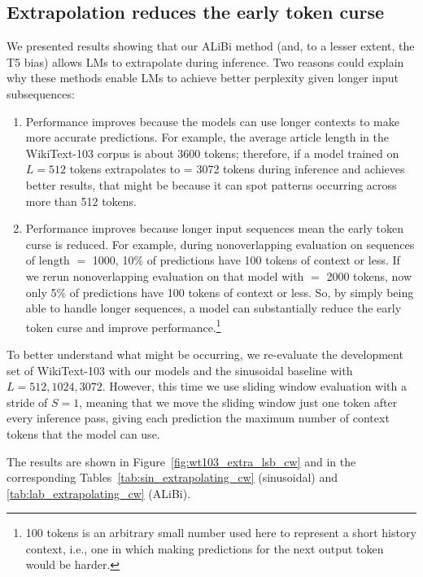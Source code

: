 \subsection{Extrapolation reduces the early token curse}





We presented results showing that our ALiBi method (and, to a lesser extent, the T5 bias) allows LMs to extrapolate during inference. Two reasons could explain why these methods enable LMs to achieve better perplexity given longer input subsequences:
\begin{enumerate}
  \item Performance improves because the models can use longer contexts to make more accurate predictions. For example, the average article length in the WikiText-103 corpus is about 3600 tokens; therefore, if a model trained on $L=512$ tokens extrapolates to \li = 3072 tokens during inference and achieves better results, that might be because it can spot patterns occurring across more than 512 tokens.
  \item Performance improves because longer input sequences mean the early token curse is reduced. %
  For example, during nonoverlapping evaluation on sequences of length \li $=$ 1000, 10\% of predictions have 100 tokens of context or less. If we rerun nonoverlapping evaluation on that model with \li $=$ 2000 tokens, now only 5\% of predictions have 100 tokens of context or less. So, by simply being able to handle longer sequences, a model can substantially reduce the early token curse and improve performance.\footnote{100 tokens is an arbitrary small number used here to represent a short history context, i.e., one in which making predictions for the next output token would be harder.}
\end{enumerate}

To better understand what might be occurring, we re-evaluate the development set of WikiText-103 with our models and the sinusoidal baseline with $L = 512, 1024, 3072$. However, this time we use sliding window evaluation with a stride of $S=1$, meaning that we move the sliding window just one token after every inference pass, giving each prediction the maximum number of context tokens that the model can use. 



The results are shown in Figure~\ref{fig:wt103_extra_lsb_cw} and in the corresponding Tables~\ref{tab:sin_extrapolating_cw} (sinusoidal) and \ref{tab:lab_extrapolating_cw} (ALiBi). 

